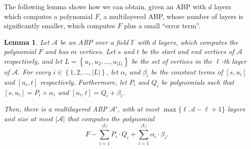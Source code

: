 \documentclass[10pt,a4paper]{article}
\newtheorem{lemma}[theorem]{Lemma}
\newcommand{\F}{\mathbb F}
\newcommand{\set}[1]{\left\{#1\right\}}
\newcommand{\abs}[1]{\left|#1\right|}
\begin{document}
The following lemma shows how we can obtain, given an ABP with $d$ layers which computes a polynomial $F$, a multilayered ABP, whose number of layers is significantly smaller, which computes $F$ plus a small ``error term''.
	
\begin{lemma}\label{lem:shrinkage for a single layered abp}
	Let $\mathcal{A}$ be an ABP over a field $\F$ with $d$ layers, which computes the polynomial $F$ and has $m$ vertices. Let $s$ and $t$ be the start and end vertices of $\mathcal{A}$ respectively, and let $L = \set{u_1, u_2, \ldots, u_{|L|}}$ be the set of vertices in the $\ell$-th layer of $\mathcal{A}$. For every $i \in \set{1, 2, \ldots, |L|}$, let $\alpha_i$ and $\beta_i$ be the constant terms of $[s,u_i]$ and $[u_i,t]$ respectively. Furthermore, let $P_i$ and $Q_i$ be polynomials such that $[s,u_i] = P_i + \alpha_i$ and $[u_i,t] = Q_i + \beta_i$.
		
	Then, there is a multilayered ABP ${\mathcal{{A}}}'$,  with at most $\max\{\ell, d-\ell + 1\}$ layers and size at most $\abs{\mathcal{A}}$ that computes the polynomial 
	\[
		F - \sum_{i=1}^{\abs{L}} P_i \cdot Q_i + \sum_{i=1}^{\abs{L}} \alpha_i \cdot \beta_i .
	\]
\end{lemma}
	
\end{document}
